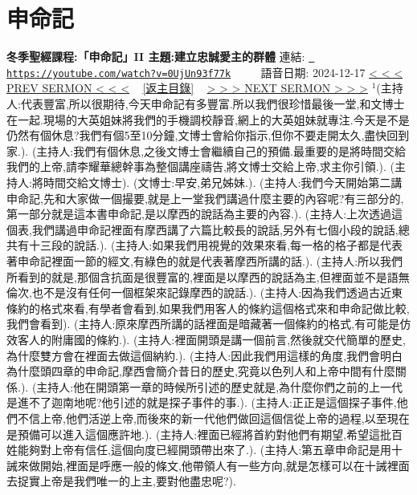 \documentclass{book}
\begin{document}
\section{申命記}
\label{sec:0UjUn93f77k}
\textbf{冬季聖經課程:「申命記」II 主題:建立忠誠愛主的群體}
\newline
\newline
連結: \href{https://youtube.com/watch?v=0UjUn93f77k}{\texttt{ https://youtube.com/watch?v=0UjUn93f77k}} ~~~~ 語音日期: 2024-12-17 
\newline
\newline
\hyperref[sec:m_AdQi66HCM]{\small{< < < PREV SERMON < < <}}
~
\hyperref[sec:index]{\small{[返主目錄]}}
~
\hyperref[sec:VhiGoXEG1RY]{\small{> > > NEXT SERMON > > >}}
\newline
\newline
$^{1}$(主持人:代表豐富,所以很期待,今天申命記有多豐富.所以我們很珍惜最後一堂,和文博士在一起.現場的大英姐妹將我們的手機調校靜音,網上的大英姐妹就專注.今天是不是仍然有個休息?我們有個5至10分鐘,文博士會給你指示,但你不要走開太久,盡快回到家.).
(主持人:我們有個休息,之後文博士會繼續自己的預備.最重要的是將時間交給我們的上帝,請李耀華總幹事為整個講座禱告,將文博士交給上帝,求主你引領.).
(主持人:將時間交給文博士).
(文博士:早安,弟兄姊妹.).
(主持人:我們今天開始第二講申命記,先和大家做一個撮要,就是上一堂我們講過什麼主要的內容呢?有三部分的,第一部分就是這本書申命記,是以摩西的說話為主要的內容.).
(主持人:上次透過這個表,我們講過申命記裡面有摩西講了六篇比較長的說話,另外有七個小段的說話,總共有十三段的說話.).
(主持人:如果我們用視覺的效果來看,每一格的格子都是代表著申命記裡面一節的經文,有綠色的就是代表著摩西所講的話.).
(主持人:所以我們所看到的就是,那個含抗面是很豐富的,裡面是以摩西的說話為主,但裡面並不是語無倫次,也不是沒有任何一個框架來記錄摩西的說話.).
(主持人:因為我們透過古近東條約的格式來看,有學者會看到,如果我們用客人的條約這個格式來和申命記做比較,我們會看到).
(主持人:原來摩西所講的話裡面是暗藏著一個條約的格式,有可能是仿效客人的附庸國的條約.).
(主持人:裡面開頭是講一個前言,然後就交代簡單的歷史,為什麼雙方會在裡面去做這個納約.).
(主持人:因此我們用這樣的角度,我們會明白為什麼頭四章的申命記,摩西會簡介昔日的歷史,究竟以色列人和上帝中間有什麼關係.).
(主持人:他在開頭第一章的時候所引述的歷史就是,為什麼你們之前的上一代是進不了迦南地呢?他引述的就是探子事件的事.).
(主持人:正正是這個探子事件,他們不信上帝,他們活逆上帝,而後來的新一代他們做回這個信從上帝的過程,以至現在是預備可以進入這個應許地.).
(主持人:裡面已經將首約對他們有期望,希望這批百姓能夠對上帝有信任,這個向度已經開頭帶出來了.).
(主持人:第五章申命記是用十誡來做開始,裡面是呼應一般的條文,他帶領人有一些方向,就是怎樣可以在十誡裡面去捉實上帝是我們唯一的上主,要對他盡忠呢?).
\end{document}
